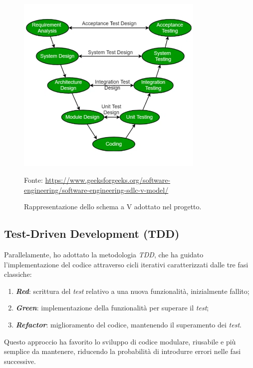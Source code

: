 \begin{figure}[H]
    \begin{center}
    \includegraphics[width=0.8\textwidth]{img/V-model.png}
    \caption{Rappresentazione dello schema a V adottato nel progetto.}
    Fonte: \url{https://www.geeksforgeeks.org/software-engineering/software-engineering-sdlc-v-model/}
    \label{fig:schema-v}
    \end{center}
\end{figure}

\subsection*{Test-Driven Development (TDD)}
Parallelamente, ho adottato la metodologia \textit{TDD}, che ha guidato l'implementazione del codice attraverso cicli iterativi caratterizzati dalle tre fasi classiche:
\begin{enumerate}
    \item \textit{\textbf{Red}}: scrittura del \textit{test} relativo a una nuova funzionalità, inizialmente fallito;
    \item \textit{\textbf{Green}}: implementazione della funzionalità per superare il \textit{test};
    \item \textit{\textbf{Refactor}}: miglioramento del codice, mantenendo il superamento dei \textit{test}.
\end{enumerate}
Questo approccio ha favorito lo sviluppo di codice modulare, riusabile e più semplice da mantenere, riducendo la probabilità di introdurre errori nelle fasi successive.  

